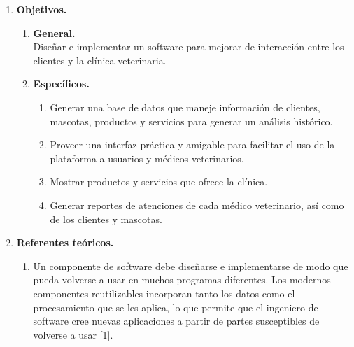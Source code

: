 \documentclass[12pt,a4paper,oneside]{book}
\begin{document}
\begin{enumerate}
\begin{enumerate}
\begin{enumerate}
						\item \textbf{¿Por qu\'e es importante este trabajo de unidad?}\\
						
						Porque mejora el actual c\'odigo fuente y como consecuencia aumenta el rendimiento del sistema. \\
						
					\end{enumerate}
					
					\item \textbf{Alcance.}
					
						\begin{itemize}
							\item El Sistema contará con una base de datos ,en la nube.
							\item El Sistema contará de un control de Registros.
							\item Contará con reportes de Servicios.
							
						\end{itemize}
				\end{enumerate}
		
		\item \textbf{Objetivos. } 
				\begin{enumerate}
					\item \textbf{General.} \\
						Dise\~nar e implementar un software para mejorar de interacci\'on entre los clientes y la cl\'inica veterinaria.	
						
					\item \textbf{Espec\'ificos.}
					
					\begin{enumerate}
						
						\item Generar una base de datos que maneje informaci\'on de clientes, mascotas, productos y servicios para generar un an\'alisis hist\'orico.
						\item Proveer una interfaz pr\'actica y amigable para facilitar el uso de la plataforma a usuarios y m\'edicos veterinarios.
						\item Mostrar productos y servicios que ofrece la cl\'inica.
						\item Generar reportes de atenciones de cada m\'edico veterinario, as\'i como de los clientes y mascotas.
						
					\end{enumerate}
					
				\end{enumerate}
		\item \textbf{Referentes te\'oricos.}
			 \begin{enumerate}
			  	\item Un componente de software debe diseñarse e implementarse de modo que pueda volverse a usar en muchos programas diferentes. Los modernos componentes reutilizables incorporan tanto los datos como el procesamiento que se les aplica, lo que permite que el ingeniero de software cree nuevas aplicaciones a partir de partes susceptibles de volverse a usar [1].\\
			  	

\end{enumerate}
\end{enumerate}
\end{document}
